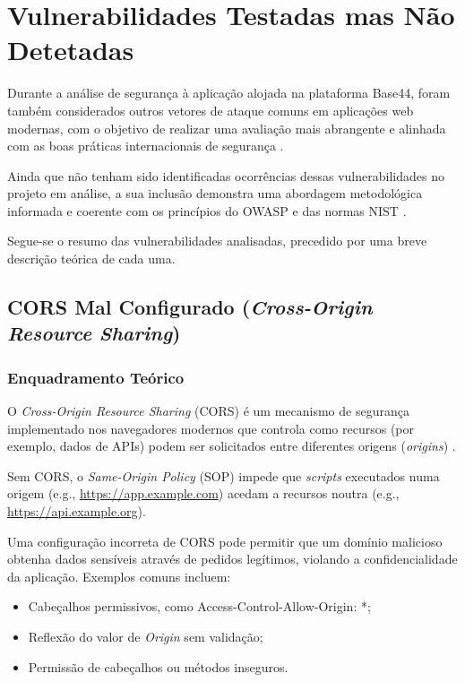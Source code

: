 \section{Vulnerabilidades Testadas mas Não Detetadas}

Durante a análise de segurança à aplicação alojada na plataforma Base44, foram também considerados outros vetores de ataque comuns em aplicações web modernas, com o objetivo de realizar uma avaliação mais abrangente e alinhada com as boas práticas internacionais de segurança \cite{ref1, ref2}.

Ainda que não tenham sido identificadas ocorrências dessas vulnerabilidades no projeto em análise, a sua inclusão demonstra uma abordagem metodológica informada e coerente com os princípios do OWASP e das normas NIST \cite{ref3, ref4}.

Segue-se o resumo das vulnerabilidades analisadas, precedido por uma breve descrição teórica de cada uma.

\subsection{CORS Mal Configurado (\textit{Cross-Origin Resource Sharing})}

\subsubsection{Enquadramento Teórico}

O \textit{Cross-Origin Resource Sharing} (CORS) é um mecanismo de segurança implementado nos navegadores modernos que controla como recursos (por exemplo, dados de APIs) podem ser solicitados entre diferentes origens (\textit{origins}) \cite{ref5}.

Sem CORS, o \textit{Same-Origin Policy} (SOP) impede que \textit{scripts} executados numa origem (e.g., \url{https://app.example.com}) acedam a recursos noutra (e.g., \url{https://api.example.org}).

Uma configuração incorreta de CORS pode permitir que um domínio malicioso obtenha dados sensíveis através de pedidos legítimos, violando a confidencialidade da aplicação. Exemplos comuns incluem:
\begin{itemize}

\item Cabeçalhos permissivos, como Access-Control-Allow-Origin: *;

\item Reflexão do valor de \textit{Origin} sem validação;

\item Permissão de cabeçalhos ou métodos inseguros.

\end{itemize}

